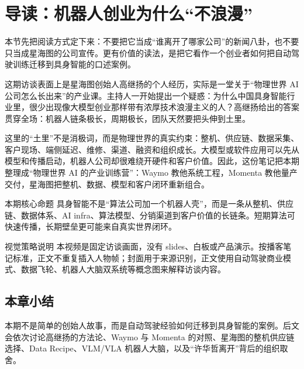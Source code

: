 \section{导读：机器人创业为什么“不浪漫”}

本节先把阅读方式定下来：不要把它当成“谁离开了哪家公司”的新闻八卦，也不要只当成星海图的公司宣传。更有价值的读法，是把它看作一个创业者如何把自动驾驶训练迁移到具身智能的口述案例。

这期访谈表面上是星海图创始人高继扬的个人经历，实际是一堂关于“物理世界 AI 公司怎么长出来”的产业课。主持人一开始提出一个疑惑：为什么中国具身智能行业里，很少出现像大模型创业那样带有浓厚技术浪漫主义的人？高继扬给出的答案贯穿全场：机器人链条极长，周期极长，团队天然要把头伸到土里。

这里的“土里”不是消极词，而是物理世界的真实约束：整机、供应链、数据采集、客户现场、端侧延迟、维修、渠道、融资和组织成长。大模型或软件应用可以先从模型和传播启动，机器人公司却很难绕开硬件和客户价值。因此，这份笔记把本期整理成“物理世界 AI 的产业训练营”：Waymo 教他系统工程，Momenta 教他量产交付，星海图把整机、数据、模型和客户闭环重新组合。

\begin{importantbox}{本期核心命题}
具身智能不是“算法公司加一个机器人壳”，而是一条从整机、供应链、数据体系、AI infra、算法模型、分销渠道到客户价值的长链条。短期算法可快速传播，长期壁垒更可能来自真实世界闭环。
\end{importantbox}

\begin{knowledgebox}{视觉策略说明}
本视频是固定访谈画面，没有 slides、白板或产品演示。按播客笔记标准，正文不重复插入人物帧；封面用于来源识别，正文使用自动驾驶商业模式、数据飞轮、机器人大脑双系统等概念图来解释访谈内容。
\end{knowledgebox}

\subsection{本章小结}

本期不是简单的创始人故事，而是自动驾驶经验如何迁移到具身智能的案例。后文会依次讨论高继扬的方法论、Waymo 与 Momenta 的对照、星海图的整机供应链选择、Data Recipe、VLM/VLA 机器人大脑，以及“许华哲离开”背后的组织取舍。


